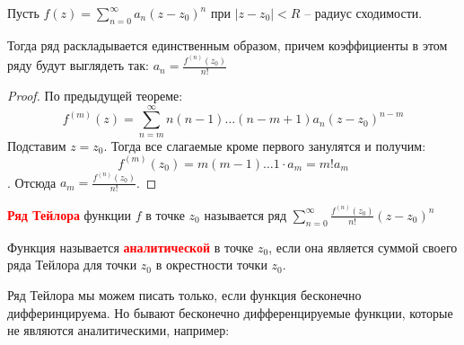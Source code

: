 
\begin{theorem} \thmslash
	
	Пусть $f(z) = \sum\limits_{n=0}^{\infty} a_n(z - z_0)^n$ при $|z-z_0| < R$ -- радиус сходимости.
	
	Тогда ряд раскладывается единственным образом, причем коэффициенты в этом ряду будут выглядеть так: $a_n = \frac{f^{(n)}(z_0)}{n!}$
	\begin{proof} \thmslash
	
		По предыдущей теореме:
		\[
		f^{(m)}(z) = \sum\limits_{n=m}^{\infty} n(n-1)\ldots(n-m+1)a_n(z-z_0)^{n-m}
		\]
		Подставим $z = z_0$. Тогда все слагаемые кроме первого занулятся и получим: 
		\[
		f^{(m)}(z_0) = m(m-1)\ldots1\cdot a_m = m!a_m
		\].
		Отсюда $a_m = \frac{f^{(n)}(z_0)}{n!}$.
	\end{proof}
\end{theorem}

\begin{definition} \thmslash
	
	\textcolor{red}{\textbf{Ряд Тейлора}} функции $f$ в точке $z_0$ называется ряд $\sum\limits_{n=0}^{\infty} \frac{f^{(n)}(z_0)}{n!}(z-z_0)^n$
\end{definition}

\begin{definition} \thmslash
	
	Функция называется \textcolor{red}{\textbf{аналитической}} в точке $z_0$, если она является суммой своего ряда Тейлора для точки $z_0$ в окрестности точки $z_0$.
\end{definition}

Ряд Тейлора мы можем писать только, если функция бесконечно дифферинцируема. Но бывают бесконечно дифференцируемые функции, которые не являются аналитическими, например:

